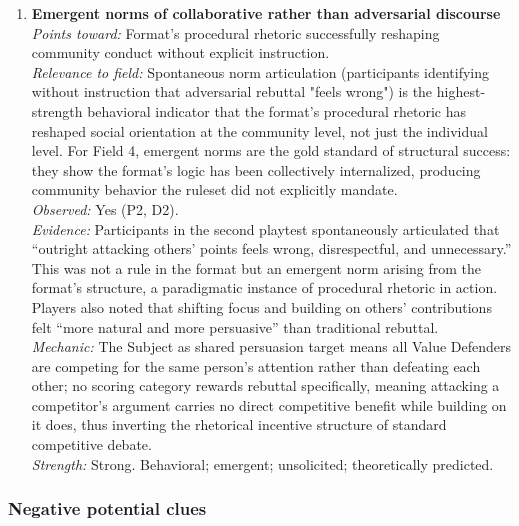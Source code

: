 \begin{enumerate}
\item \textbf{Emergent norms of collaborative rather than adversarial discourse}\\
\textit{Points toward:} Format's procedural rhetoric successfully reshaping community conduct without explicit instruction.\\
\textit{Relevance to field:} Spontaneous norm articulation (participants identifying without instruction that adversarial rebuttal "feels wrong") is the highest-strength behavioral indicator that the format's procedural rhetoric has reshaped social orientation at the community level, not just the individual level. For Field 4, emergent norms are the gold standard of structural success: they show the format's logic has been collectively internalized, producing community behavior the ruleset did not explicitly mandate.\\
\textit{Observed:} Yes (P2, D2).\\
\textit{Evidence:} Participants in the second playtest spontaneously articulated that ``outright attacking others' points feels wrong, disrespectful, and unnecessary.'' This was not a rule in the format but an emergent norm arising from the format's structure, a paradigmatic instance of procedural rhetoric in action. Players also noted that shifting focus and building on others' contributions felt ``more natural and more persuasive'' than traditional rebuttal.\\
\textit{Mechanic:} The Subject as shared persuasion target means all Value Defenders are competing for the same person's attention rather than defeating each other; no scoring category rewards rebuttal specifically, meaning attacking a competitor's argument carries no direct competitive benefit while building on it does, thus inverting the rhetorical incentive structure of standard competitive debate.\\
\textit{Strength:} Strong. Behavioral; emergent; unsolicited; theoretically predicted.

\end{enumerate}

\subsubsection*{Negative potential clues}


